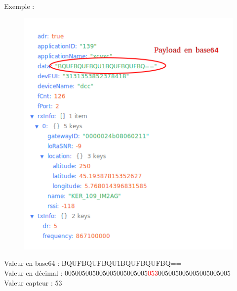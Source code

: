 \documentclass{article}
\begin{document}
Exemple : \\
\begin{figure}[H]
\begin{center}
\advance\leftskip-3cm
\advance\rightskip-3cm
\includegraphics[keepaspectratio=true,scale=0.4]{data_dry2.png}
\label{visina8}
\end{center}\end{figure}

Valeur en base64 : BQUFBQUFBQU1BQUFBQUFBQ== \\
Valeur en décimal : 005005005005005005005005\textcolor{red}{053}005005005005005005005 \\
Valeur capteur : 53 \\

\end{document}
